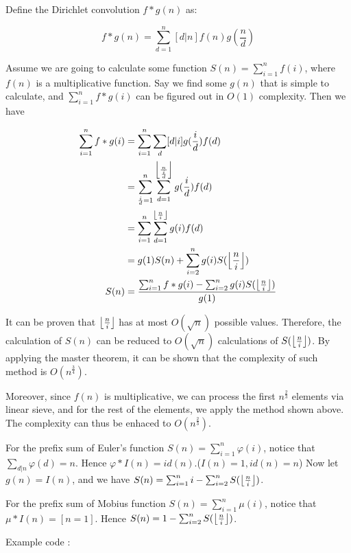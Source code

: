 Define the Dirichlet convolution $f*g(n)$ as:

$$f*g(n)=\sum^n_{d=1}[d|n]f(n)g(\frac{n}{d})$$

Assume we are going to calculate some function $S(n)=\sum^n_{i=1}f(i)$,
where $f(n)$ is a multiplicative function.
Say we find some $g(n)$ that is simple to calculate,
and $\sum^n_{i=1}f*g(i)$ can be figured out in $O(1)$ complexity.
Then we have

\begin{equation*}
\begin{split}
\sum^n_{i=1}f*g(i)	&=\sum^n_{i=1}\sum_d[d|i]g(\frac{i}{d})f(d)\\
					&=\sum^n_{\frac{i}{d}=1}\sum^{\floor*{\frac{n}{\frac{i}{d}}}}_{d=1}g(\frac{i}{d})f(d)\\
					&=\sum^n_{i=1}\sum^{\floor*{\frac{n}{i}}}_{d=1}g(i)f(d)\\
					&=g(1)S(n)+\sum^n_{i=2}g(i)S(\floor*{\frac{n}{i}})\\
S(n)				&=\frac{\sum^n_{i=1}f*g(i)-\sum^n_{i=2}g(i)S(\floor*{\frac{n}{i}})}{g(1)}\\
\end{split}
\end{equation*}


It can be proven that $\floor*{\frac{n}{i}}$ has at most $O(\sqrt{n})$ possible values.
Therefore, the calculation of $S(n)$ can be reduced to $O(\sqrt{n})$ calculations of $S(\floor*{\frac{n}{i}})$.
By applying the master theorem, it can be shown that the complexity of such method is $O(n^{\frac{3}{4}})$.

Moreover, since $f(n)$ is multiplicative, we can process the first $n^{\frac{2}{3}}$ elements via linear sieve,
and for the rest of the elements, we apply the method shown above. The complexity can thus be enhaced to $O(n^{\frac{2}{3}})$.

For the prefix sum of Euler's function $S(n)=\sum^n_{i=1}\varphi(i)$, notice that $\sum_{d|n}\varphi(d)=n$.
Hence $\varphi*I(n)=id(n)$.($I(n)=1,id(n)=n$)
Now let $g(n)=I(n)$, and we have $S(n)=\sum^n_{i=1}i-\sum^n_{i=2}S(\floor*{\frac{n}{i}})$.

For the prefix sum of Mobius function $S(n)=\sum^n_{i=1}\mu(i)$, notice that $\mu*I(n)=[n=1]$.
Hence $S(n)=1-\sum^n_{i=2}S(\floor*{\frac{n}{i}})$.

Example code :

